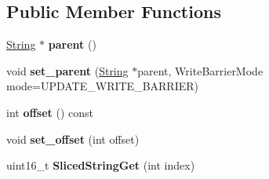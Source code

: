 \subsection*{Public Member Functions}
\begin{DoxyCompactItemize}
\item 
\hyperlink{classv8_1_1internal_1_1_string}{String} $\ast$ {\bfseries parent} ()\hypertarget{classv8_1_1internal_1_1_sliced_string_a7ea2c5e478790e6bdda1391caf22a838}{}\label{classv8_1_1internal_1_1_sliced_string_a7ea2c5e478790e6bdda1391caf22a838}

\item 
void {\bfseries set\+\_\+parent} (\hyperlink{classv8_1_1internal_1_1_string}{String} $\ast$parent, Write\+Barrier\+Mode mode=U\+P\+D\+A\+T\+E\+\_\+\+W\+R\+I\+T\+E\+\_\+\+B\+A\+R\+R\+I\+ER)\hypertarget{classv8_1_1internal_1_1_sliced_string_a7fb536147ef4fe0a5fb8cabea667d93f}{}\label{classv8_1_1internal_1_1_sliced_string_a7fb536147ef4fe0a5fb8cabea667d93f}

\item 
int {\bfseries offset} () const \hypertarget{classv8_1_1internal_1_1_sliced_string_a7e9c5c8b3e9f3fa4c68d849029ff47c7}{}\label{classv8_1_1internal_1_1_sliced_string_a7e9c5c8b3e9f3fa4c68d849029ff47c7}

\item 
void {\bfseries set\+\_\+offset} (int offset)\hypertarget{classv8_1_1internal_1_1_sliced_string_ac2d7335184687e4095a451e7f0a234d9}{}\label{classv8_1_1internal_1_1_sliced_string_ac2d7335184687e4095a451e7f0a234d9}

\item 
uint16\+\_\+t {\bfseries Sliced\+String\+Get} (int index)\hypertarget{classv8_1_1internal_1_1_sliced_string_a8287c8f2ffdd4bc311b1923d17002717}{}\label{classv8_1_1internal_1_1_sliced_string_a8287c8f2ffdd4bc311b1923d17002717}

\end{DoxyCompactItemize}
